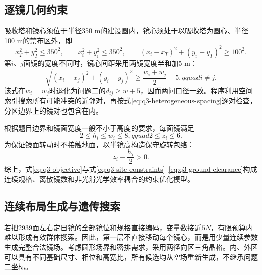\subsection{逐镜几何约束}

吸收塔和镜心须位于半径350 m的建设圆内，镜心须处于以吸收塔为圆心、半径100 m的禁布区外，即
\begin{equation}
 x_T^2+y_T^2\le350^2,\qquad
 x_i^2+y_i^2\le350^2,\qquad
 (x_i-x_T)^2+(y_i-y_T)^2\ge100^2.
 \label{eq:q3-site-constraints}
\end{equation}
第$i$、$j$面镜的宽度不同时，镜心间距采用两镜宽度半和加5 m：
\begin{equation}
 \sqrt{(x_i-x_j)^2+(y_i-y_j)^2}
 \ge\frac{w_i+w_j}{2}+5,qquad i\ne j.
 \label{eq:q3-heterogeneous-spacing}
\end{equation}
该式在$w_i=w_j$时退化为问题二的$d_{ij}\ge w+5$，因而两问口径一致。程序利用空间索引搜索所有可能冲突的近邻对，再按式\eqref{eq:q3-heterogeneous-spacing}逐对检查，分区边界上的镜对也包含在内。

根据题目边界和镜面宽度一般不小于高度的要求，每面镜满足
\begin{equation}
 2\le h_i\le w_i\le8,qquad 2\le z_i\le6.
 \label{eq:q3-size-constraints}
\end{equation}
为保证镜面转动时不接触地面，以半镜高构造保守旋转包络：
\begin{equation}
 z_i-\frac{h_i}{2}>0.
 \label{eq:q3-ground-clearance}
\end{equation}
综上，式\eqref{eq:q3-objective}与式\eqref{eq:q3-site-constraints}--\eqref{eq:q3-ground-clearance}构成连续规格、离散镜数和非光滑光学效率耦合的约束优化模型。

\subsection{连续布局生成与遗传搜索}

若把2939面左右定日镜的全部镜位和规格直接编码，变量数接近$5N$，有限预算内难以形成有效群体搜索。因此，第一层不直接移动每个镜心，而是用少量连续参数生成完整合法镜场。考虑圆形场界和密排需求，采用两径向区三角晶格。内、外区可以具有不同基础尺寸、相位和高宽比，所有候选均从空场重新生成，不继承问题二坐标。


